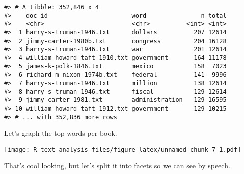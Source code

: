 \documentclass[]{book}
\newenvironment{Shaded}{\begin{snugshade}}{\end{snugshade}}
\newcommand{\DataTypeTok}[1]{\textcolor[rgb]{0.13,0.29,0.53}{#1}}
\newcommand{\DecValTok}[1]{\textcolor[rgb]{0.00,0.00,0.81}{#1}}
\newcommand{\KeywordTok}[1]{\textcolor[rgb]{0.13,0.29,0.53}{\textbf{#1}}}
\newcommand{\NormalTok}[1]{#1}
\newcommand{\OperatorTok}[1]{\textcolor[rgb]{0.81,0.36,0.00}{\textbf{#1}}}
\newcommand{\OtherTok}[1]{\textcolor[rgb]{0.56,0.35,0.01}{#1}}
\newcommand{\StringTok}[1]{\textcolor[rgb]{0.31,0.60,0.02}{#1}}
\begin{document}
\begin{verbatim}
#> # A tibble: 352,846 x 4
#>    doc_id                       word               n total
#>    <chr>                        <chr>          <int> <int>
#>  1 harry-s-truman-1946.txt      dollars          207 12614
#>  2 jimmy-carter-1980b.txt       congress         204 16128
#>  3 harry-s-truman-1946.txt      war              201 12614
#>  4 william-howard-taft-1910.txt government       164 11178
#>  5 james-k-polk-1846.txt        mexico           158  7023
#>  6 richard-m-nixon-1974b.txt    federal          141  9996
#>  7 harry-s-truman-1946.txt      million          138 12614
#>  8 harry-s-truman-1946.txt      fiscal           129 12614
#>  9 jimmy-carter-1981.txt        administration   129 16595
#> 10 william-howard-taft-1912.txt government       129 10215
#> # ... with 352,836 more rows
\end{verbatim}

Let's graph the top words per book.

\begin{Shaded}
\end{Shaded}

\texttt{[image: R-text-analysis\_files/figure-latex/unnamed-chunk-7-1.pdf]}

That's cool looking, but let's split it into facets so we can see by speech.

\begin{Shaded}
\end{Shaded}
\end{document}
